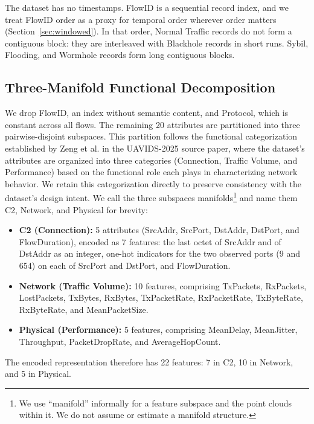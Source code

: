 \documentclass[conf]{new-aiaa}
\begin{document}
The dataset has no timestamps. FlowID is a sequential record index, and we treat FlowID order as a proxy for temporal order wherever order matters (Section~\ref{sec:windowed}). In that order, Normal Traffic records do not form a contiguous block: they are interleaved with Blackhole records in short runs. Sybil, Flooding, and Wormhole records form long contiguous blocks.

\subsection{Three-Manifold Functional Decomposition}
\label{sec:decomposition}

We drop FlowID, an index without semantic content, and Protocol, which is constant across all flows. The remaining 20 attributes are partitioned into three pairwise-disjoint subspaces. This partition follows the functional categorization established by Zeng et al. \cite{Zeng} in the UAVIDS-2025 source paper, where the dataset's attributes are organized into three categories (Connection, Traffic Volume, and Performance) based on the functional role each plays in characterizing network behavior. We retain this categorization directly to preserve consistency with the dataset's design intent. We call the three subspaces manifolds\footnote{We use ``manifold'' informally for a feature subspace and the point clouds within it. We do not assume or estimate a manifold structure.} and name them C2, Network, and Physical for brevity:

\begin{itemize}
    \item \textbf{C2 (Connection):} 5 attributes (SrcAddr, SrcPort, DstAddr, DstPort, and FlowDuration), encoded as 7 features: the last octet of SrcAddr and of DstAddr as an integer, one-hot indicators for the two observed ports (9 and 654) on each of SrcPort and DstPort, and FlowDuration.
    \item \textbf{Network (Traffic Volume):} 10 features, comprising TxPackets, RxPackets, LostPackets, TxBytes, RxBytes, TxPacketRate, RxPacketRate, TxByteRate, RxByteRate, and MeanPacketSize.
    \item \textbf{Physical (Performance):} 5 features, comprising MeanDelay, MeanJitter, Throughput, PacketDropRate, and AverageHopCount.
\end{itemize}

The encoded representation therefore has 22 features: 7 in C2, 10 in Network, and 5 in Physical.
\end{document}

